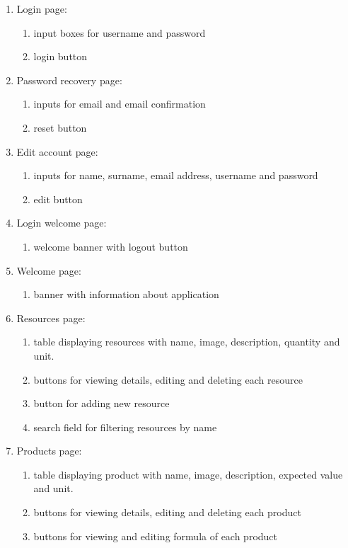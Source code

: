 \documentclass[a4paper,11pt,twoside]{report}
\theoremstyle{definition}
\begin{document}
\begin{enumerate}
\item Login page:
\begin{enumerate}
\item input boxes for username and password
\item login button
\end{enumerate}
\item Password recovery page:
\begin{enumerate}
\item inputs for email and email confirmation
\item reset button
\end{enumerate}
\item Edit account page:
\begin{enumerate}
\item inputs for name, surname, email address, username and password
\item edit button
\end{enumerate}
\item Login welcome page:
\begin{enumerate}
\item welcome banner with logout button
\end{enumerate}
\item Welcome page:
\begin{enumerate}
\item banner with information about application
\end{enumerate}
\item Resources page:
\begin{enumerate}
\item table displaying resources with name, image, description, quantity and unit.
\item buttons for viewing details, editing and deleting each resource
\item button for adding new resource
\item search field for filtering resources by name 
\end{enumerate}
\item Products page:
\begin{enumerate}
\item table displaying product with name, image, description, expected value and unit.
\item buttons for viewing details, editing and deleting each product
\item buttons for viewing and editing formula of each product

\end{enumerate}
\end{enumerate}
\end{document}
